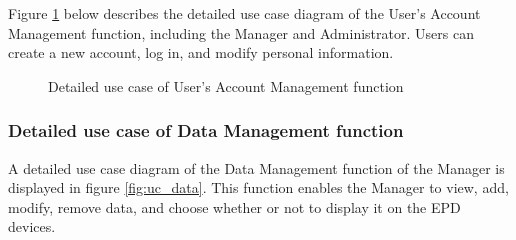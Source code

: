 \documentclass[../Main.tex]{subfiles}
\begin{document}
Figure \ref{fig:uc_user} below describes the detailed use case diagram of the User's Account Management function, including the Manager and Administrator. Users can create a new account, log in, and modify personal information.

\begin{figure}[H]
    \centering
    \caption{Detailed use case of User's Account Management function}
    \label{fig:uc_user}
\end{figure}

\subsubsection{Detailed use case of Data Management function}
A detailed use case diagram of the Data Management function of the Manager is displayed in figure \ref{fig:uc_data}. This function enables the Manager to view, add, modify, remove data, and choose whether or not to display it on the \gls{EPD} devices.
\end{document}
